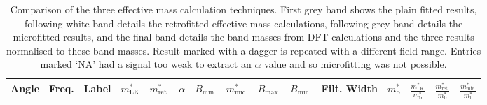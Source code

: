\begin{table}
    \begin{center}
        \caption{Comparison of the three effective mass calculation techniques. First grey band shows the plain \LK fitted results, following white band details the retrofitted effective mass calculations, following grey band details the microfitted results, and the final band details the band masses from DFT calculations and the three results normalised to these band masses. Result marked with a dagger is repeated with a different field range. Entries marked `NA' had a signal too weak to extract an $\alpha$ value and so microfitting was not possible.}
{\small
        \begin{tabular}[htbp]{rrlrrrrrrrrrrrr}
\toprule
Angle	& Freq.	& Label	& $m^*_{\textrm{LK}}$	& $m^*_{\textrm{ret.}}$	& $\alpha$	& $B_{\textrm{min.}}$	& $m^*_{\textrm{mic.}}$	& $B_{\textrm{max.}}$	& $B_{\textrm{min.}}$	& Filt. Width	& $m^*_{\textrm{b}}$	& $\frac{m^*_{\textrm{LK}}}{m^*_{\textrm{b}}}$	& $\frac{m^*_{\textrm{ret.}}}{m^*_{\textrm{b}}}$	& $\frac{m^*_{\textrm{mic.}}}{m^*_{\textrm{b}}}$ \\
\midrule

\bottomrule
        \end{tabular}
}
        \label{Table:3:EffectiveMassResults}
    \end{center}
\end{table}
